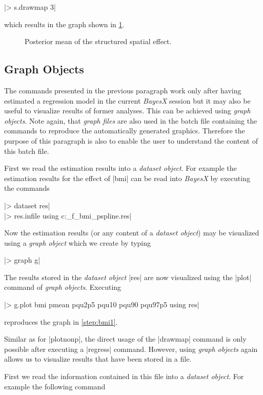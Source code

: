 |> s.drawmap 3|

which results in the graph shown in \ref{step:spat1}.

\begin{figure}[ht]
\begin{center}
{\it\caption{Posterior mean of the structured spatial
effect.\label{step:spat1}}}
\end{center}
\end{figure}

\subsection{Graph Objects}

The commands presented in the previous paragraph work only after having estimated a regression model in the current {\it
BayesX} session but it may also be useful to visualize results of former analyses. This can be achieved using {\it graph
objects}. Note again, that {\it graph files} are also used in the batch file containing the commands to reproduce the
automatically generated graphics. Therefore the purpose of this paragraph is also to enable the user to understand the content
of this batch file.

First we read the estimation results into a {\it dataset object}. For example the estimation results for the effect of |bmi|
can be read into {\it BayesX} by executing the commands

|> dataset res|\\
|> res.infile using c:\data\s_f_bmi_pspline.res|

Now the estimation results (or any content of a {\it dataset object}) may be visualized using a {\it graph object} which we
create by typing

|> graph g|

The results stored in the {\it dataset object} |res| are now visualized using the |plot| command of {\it graph objects}.
Executing

|> g.plot bmi pmean pqu2p5 pqu10 pqu90 pqu97p5 using res|

reproduces the graph in \ref{step:bmi1}.

Similar as for |plotnonp|, the direct usage of the |drawmap| command is only possible after executing a |regress| command.
However, using {\it graph objects} again allows us to visualize results that have been stored in a file.

First we read the information contained in this file into a {\it dataset object}. For example the following command

